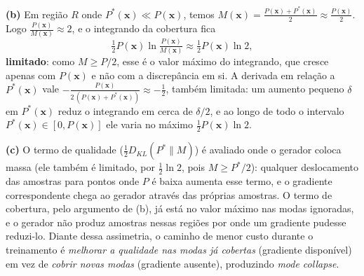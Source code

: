 \documentclass{dlproblemset}
\begin{document}
\begin{enumerate}[I)]
    \textbf{(b)} Em região $R$ onde $P^{*}(\mathbf{x}) \ll P(\mathbf{x})$, temos $M(\mathbf{x}) = \tfrac{P(\mathbf{x}) + P^{*}(\mathbf{x})}{2} \approx \tfrac{P(\mathbf{x})}{2}$. Logo $\tfrac{P(\mathbf{x})}{M(\mathbf{x})} \approx 2$, e o integrando da cobertura fica
    \[
      \tfrac{1}{2}P(\mathbf{x})\ln\!\tfrac{P(\mathbf{x})}{M(\mathbf{x})} \approx \tfrac{1}{2}P(\mathbf{x})\ln 2,
    \]
    \textbf{limitado}: como $M \ge P/2$, esse é o valor máximo do integrando, que cresce apenas com $P(\mathbf{x})$ e não com a discrepância em si. A derivada em relação a $P^{*}(\mathbf{x})$ vale $-\tfrac{P(\mathbf{x})}{2\,(P(\mathbf{x}) + P^{*}(\mathbf{x}))} \approx -\tfrac{1}{2}$, também limitada: um aumento pequeno $\delta$ em $P^{*}(\mathbf{x})$ reduz o integrando em cerca de $\delta/2$, e ao longo de todo o intervalo $P^{*}(\mathbf{x}) \in [0, P(\mathbf{x})]$ ele varia no máximo $\tfrac{1}{2}P(\mathbf{x})\ln 2$.

    \textbf{(c)} O termo de qualidade ($\tfrac{1}{2}D_{KL}(P^{*}\|M)$) é avaliado onde o gerador coloca massa (ele também é limitado, por $\tfrac{1}{2}\ln 2$, pois $M \ge P^{*}/2$): qualquer deslocamento das amostras para pontos onde $P$ é baixa aumenta esse termo, e o gradiente correspondente chega ao gerador através das próprias amostras. O termo de cobertura, pelo argumento de (b), já está no valor máximo nas modas ignoradas, e o gerador não produz amostras nessas regiões por onde um gradiente pudesse reduzi-lo. Diante dessa assimetria, o caminho de menor custo durante o treinamento é \emph{melhorar a qualidade nas modas já cobertas} (gradiente disponível) em vez de \emph{cobrir novas modas} (gradiente ausente), produzindo \textit{mode collapse}.
\end{enumerate}
\end{document}
